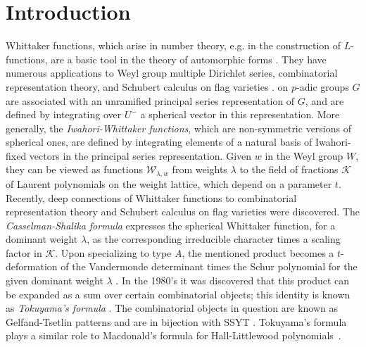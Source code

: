 \documentclass[11pt]{amsart}
\begin{document}
\section{Introduction}
\indent Whittaker functions, which arise in number theory, e.g. in the construction of $ L$-functions, are a basic tool in the theory of automorphic forms \cite{BBF,CL4}. They have numerous applications to Weyl group multiple Dirichlet series, combinatorial representation theory, and Schubert calculus on flag varieties \cite{BBL}.
\newline{} on $p$-adic groups $G$ are associated with an unramified principal series representation of ${G}$, and are defined by integrating over $U^-$ a spherical vector in this representation. More generally, the {\em Iwahori-Whittaker functions}, which are non-symmetric versions of spherical ones, are defined by integrating elements of a natural basis of Iwahori-fixed vectors in the principal series representation. Given $w$ in the Weyl group $W$, they can be viewed as functions  ${\mathcal W}_{\lambda,w}$ from weights $\lambda$ to the field of fractions $\mathcal{K}$ of Laurent polynomials on the weight lattice, which depend on a parameter $t$. Recently, deep connections of Whittaker functions to combinatorial representation theory and Schubert calculus on flag varieties were discovered.
\newline\indent The {\em Casselman-Shalika formula} \cite{casups,shiefc} expresses the spherical Whittaker function, for a dominant weight $\lambda$, as the corresponding irreducible character times a scaling factor in $\mathcal{K}$. Upon specializing to type $A$, the mentioned product becomes a $t$-deformation of the Vandermonde determinant times the Schur polynomial for the given dominant weight $\lambda$ \cite[Chapter V]{BBF}. In the 1980's it was discovered that this product can be expanded as a sum over certain combinatorial objects; this identity is known as \emph{Tokuyama's formula} \cite{G}. The combinatorial objects in question are known as Gelfand-Tsetlin patterns and are in bijection with SSYT \cite{BBF}. Tokuyama's formula plays a similar role to Macdonald's formula for Hall-Littlewood polynomials~\cite{IG}.
\end{document}
